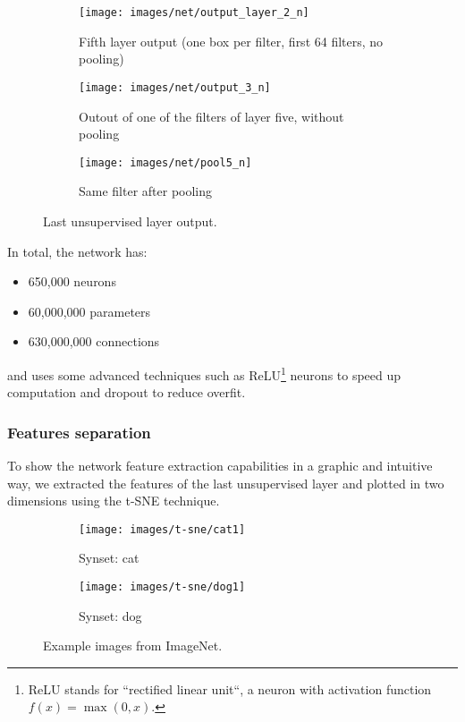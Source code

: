 \begin{figure*}[hbtp]\centering
\centering
\begin{subfigure}[t]{.4\textwidth}
    \centering
    \texttt{[image: images/net/output\_layer\_2\_n]}
    \caption{Fifth layer output (one box per filter, first 64 filters, no pooling)}
    \label{fig:output1}
\end{subfigure}%
\begin{subfigure}[t]{.4\textwidth}
    \centering
    \texttt{[image: images/net/output\_3\_n]}
    \caption{Outout of one of the filters of layer five, without pooling}
    \label{fig:output2}
\end{subfigure}
\begin{subfigure}[t]{.4\textwidth}
    \centering
    \texttt{[image: images/net/pool5\_n]}
    \caption{Same filter after pooling}
    \label{fig:output3}
\end{subfigure}
\caption{Last unsupervised layer output.}
\label{fig:output}
\end{figure*}

In total, the network has:
\begin{itemize}\itemsep0.5pt
    \item 650,000 neurons
    \item 60,000,000 parameters
    \item 630,000,000 connections
\end{itemize}
and uses some advanced techniques such as ReLU\footnote{ReLU stands for
``rectified linear unit``, a neuron with activation function $f(x) = \max(0,
x)$.} neurons to speed up computation and dropout \cite{DBLP:journals/corr/abs-1207-0580}
to reduce overfit.

\subsubsection{Features separation}

To show the network feature extraction capabilities in a graphic and intuitive
way, we extracted the features of the last unsupervised layer and plotted in two
dimensions using the t-SNE \cite{t-SNE} technique.

\begin{figure}[hbtp]\centering
\centering
\begin{subfigure}{.48\textwidth}
    \centering
    \texttt{[image: images/t-sne/cat1]}
    \caption{Synset: cat}
    \label{fig:synset_cat}
    \vspace{10pt}
\end{subfigure}
\begin{subfigure}{.48\textwidth}
    \centering
    \texttt{[image: images/t-sne/dog1]}
    \caption{Synset: dog}
    \label{fig:synset_dog}
\end{subfigure}
\caption{Example images from ImageNet.}
\label{fig:synsets}
\end{figure}

